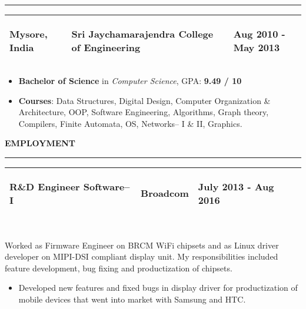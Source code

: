 \documentclass[a4paper, 10pt]{extarticle}
\begin{document}
\begin{large}
\hrule
\vspace{.1cm}
{\begin{tabular}{ p{3cm} p{10cm} p{4.4cm} }
    \textbf{Mysore, India} & \vspace{-.6cm} \begin{center}\textbf{{Sri Jaychamarajendra College of Engineering}} \end{center} \vspace{-0.8cm} &
    \vspace{-0.6cm}
    \begin{flushright}
    \textbf{Aug 2010 - May 2013} 
    \end{flushright}
    \vspace{-0.7cm} \\
    \hline
\end{tabular}}
\begin{itemize}
    \setlength\itemsep{-0.05 cm}
    \item {\textbf{Bachelor of Science} in \textit{Computer Science}, GPA: \textbf{9.49 / 10}}
    \item{\textbf{Courses}: Data Structures, Digital Design,  Computer Organization \& Architecture, OOP, Software Engineering, Algorithms, Graph theory, Compilers, Finite Automata, OS, Networks-- I \& II, Graphics.}
\end{itemize}
\vspace{.2cm}
{\LARGE{\textbf{E}}\Large{\textbf{MPLOYMENT}}}
\vspace{.1cm} \hrule \vspace{.1cm}
{\begin{tabular}{ p{6cm} p{5cm} p{6.5cm} }
    \textbf{R\&D Engineer Software--I} & \vspace{-.6cm} \begin{center}\textbf{{Broadcom}} \end{center} \vspace{-0.8cm} & 
    \vspace{-0.7cm} 
    \begin{flushright} \textbf{July 2013 - Aug 2016} \end{flushright} 
    \vspace{-0.8cm}\\
    \hline
\end{tabular}}
\vspace{0.3cm} \\
Worked as Firmware Engineer on BRCM WiFi chipsets and as Linux driver developer on MIPI-DSI compliant display unit. My responsibilities included feature development, bug fixing and productization  of chipsets.
\begin{itemize}
    \setlength\itemsep{-0.05 cm}
    \item{Developed new features and fixed bugs in display driver for productization of  mobile devices that went into market with Samsung and HTC.}
    

\end{itemize}
\end{large}
\end{document}
